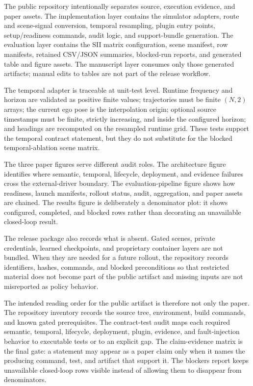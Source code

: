 \documentclass[conference,a4paper]{IEEEtran}
\begin{document}
The public repository intentionally separates source, execution evidence, and paper
assets. The implementation layer contains the simulator adapters, route and scene-signal
conversion, temporal resampling, plugin entry points, setup/readiness commands, audit
logic, and support-bundle generation. The evaluation layer contains the SII matrix
configuration, scene manifest, row manifests, retained CSV/JSON summaries, blocked-run
reports, and generated table and figure assets. The manuscript layer consumes only those
generated artifacts; manual edits to tables are not part of the release workflow.

The temporal adapter is traceable at unit-test level. Runtime frequency and horizon are
validated as positive finite values; trajectories must be finite \((N,2)\) arrays; the
current ego pose is the interpolation origin; optional source timestamps must be finite,
strictly increasing, and inside the configured horizon; and headings are recomputed on
the resampled runtime grid. These tests support the temporal contract statement, but
they do not substitute for the blocked temporal-ablation scene matrix.

The three paper figures serve different audit roles. The architecture figure identifies
where semantic, temporal, lifecycle, deployment, and evidence failures cross the
external-driver boundary. The evaluation-pipeline figure shows how readiness, launch
manifests, rollout status, audit, aggregation, and paper assets are chained. The results
figure is deliberately a denominator plot: it shows configured, completed, and blocked
rows rather than decorating an unavailable closed-loop result.

The release package also records what is absent. Gated scenes, private credentials,
learned checkpoints, and proprietary container layers are not bundled. When they are
needed for a future rollout, the repository records identifiers, hashes, commands, and
blocked preconditions so that restricted material does not become part of the public
artifact and missing inputs are not misreported as policy behavior.

The intended reading order for the public artifact is therefore not only the paper. The
repository inventory records the source tree, environment, build commands, and known
gated prerequisites. The contract-test audit maps each required semantic, temporal,
lifecycle, deployment, plugin, evidence, and fault-injection behavior to executable
tests or to an explicit gap. The claim-evidence matrix is the final gate: a statement
may appear as a paper claim only when it names the producing command, test, and artifact
that support it. The blockers report keeps unavailable closed-loop rows visible instead
of allowing them to disappear from denominators.
\end{document}
